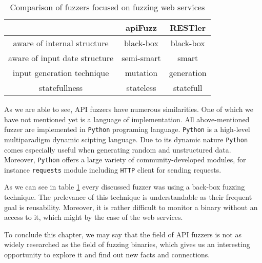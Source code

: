 \begin{table}
\begin{center}
\begin{tabular}{|c|c c|}
\hline
& apiFuzz  &  RESTler  \\
\hline
aware of internal structure & black-box & black-box \\
aware of input date structure & semi-smart & smart \\
input generation technique & mutation & generation \\
statefullness & stateless & statefull \\
\hline
\end{tabular}
\caption{Comparison of fuzzers focused on fuzzing web services}
\label{table:fuzzers-comparison}
\end{center}
\end{table}

As we are able to see, API fuzzers have numerous similarities. One of which we have not mentioned yet is a language of implementation. All above-mentioned fuzzer are implemented in \texttt{Python} programing language. \texttt{Python} is a high-level multiparadigm dynamic scipting language. Due to its dynamic nature \texttt{Python} comes especially useful when generating random and unstructured data. Moreover, \texttt{Python} offers a large variety of community-developed modules, for instance \texttt{requests} module including \texttt{HTTP} client for sending requests.

As we can see in table \ref{table:fuzzers-comparison} every discussed fuzzer was using a back-box fuzzing technique. The prelevance of this technique is understandable as their frequent goal is reusability. Moreover, it is rather difficult to monitor a binary without an access to it, which might by the case of the web services.

To conclude this chapter, we may say that the field of API fuzzers is not as widely researched as the field of fuzzing binaries, which gives us an interesting opportunity to explore it and find out new facts and connections.

